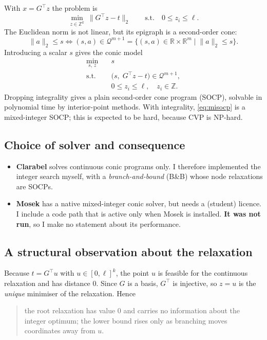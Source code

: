 \documentclass[11pt,a4paper]{article}
\newcommand{\R}{\mathbb{R}}
\newcommand{\Z}{\mathbb{Z}}
\newcommand{\norm}[1]{\lVert #1\rVert_2}
\newcommand{\BB}{B\&B}
\begin{document}
With $x=G^\top z$ the problem is
\[
  \min_{z\in\Z^k}\ \norm{G^\top z-t}\qquad\text{s.t.}\quad 0\le z_i\le\ell .
\]
The Euclidean norm is not linear, but its epigraph is a second-order cone:
\[
  \norm{a}\le s\iff (s,a)\in\mathcal{Q}^{m+1}=\{(s,a)\in\R\times\R^m\mid \norm{a}\le s\}.
\]
Introducing a scalar $s$ gives the conic model
\begin{equation}\label{eq:misocp}
\begin{aligned}
  \min_{s,\,z}\quad & s\\
  \text{s.t.}\quad  & \big(s,\;G^\top z-t\big)\in\mathcal{Q}^{m+1},\\
                    & 0\le z_i\le \ell,\quad z_i\in\Z .
\end{aligned}
\end{equation}
Dropping integrality gives a plain second-order cone program (SOCP), solvable in polynomial time by interior-point methods. With integrality, \eqref{eq:misocp} is a mixed-integer SOCP; this is expected to be hard, because CVP is NP-hard.

\subsection{Choice of solver and consequence}

\begin{itemize}
  \item \textbf{Clarabel} solves continuous conic programs only. I therefore implemented the integer search myself, with a \emph{branch-and-bound} (\BB{}) whose node relaxations are SOCPs.
  \item \textbf{Mosek} has a native mixed-integer conic solver, but needs a (student) licence. I include a code path that is active only when Mosek is installed. \textbf{It was not run}, so I make no statement about its performance.
\end{itemize}

\subsection{A structural observation about the relaxation}

Because $t=G^\top u$ with $u\in[0,\ell]^k$, the point $u$ is feasible for the continuous relaxation and has distance $0$. Since $G$ is a basis, $G^\top$ is injective, so $z=u$ is the \emph{unique} minimiser of the relaxation. Hence

\begin{quote}
the root relaxation has value $0$ and carries no information about the integer optimum; the lower bound rises only as branching moves coordinates away from $u$.
\end{quote}
\end{document}
